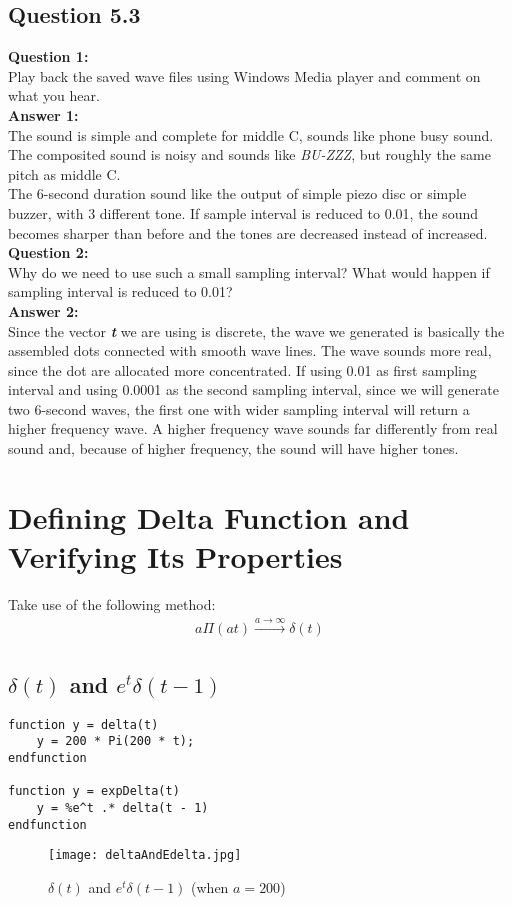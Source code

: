 \documentclass[12pt,fleqn]{article}
\begin{document}
\subsection{Question 5.3}
\textbf{Question 1:}\\
Play back the saved wave files using Windows Media player and comment on what you hear.\\
\textbf{Answer 1:}\\
The sound is simple and complete for middle C, sounds like phone busy sound.\\
The composited sound is noisy and sounds like \emph{BU-ZZZ}, but roughly the same pitch as middle C.\\
The 6-second duration sound like the output of simple piezo disc or simple buzzer, with 3 different tone. If sample interval is reduced to 0.01, the sound becomes sharper than before and the tones are decreased instead of increased.\\
\textbf{Question 2:}\\
Why do we need to use such a small sampling interval? What would happen if sampling interval is reduced to 0.01?\\
\textbf{Answer 2:}\\
Since the vector \emph{\textbf{t}} we are using is discrete, the wave we generated is basically the assembled dots connected with smooth wave lines. The wave sounds more real, since the dot are allocated more concentrated. If using 0.01 as first sampling interval and using 0.0001 as the second sampling interval, since we will generate two 6-second waves, the first one with wider sampling interval will return a higher frequency wave. A higher frequency wave sounds far differently from real sound and, because of higher frequency, the sound will have higher tones.

\section{Defining Delta Function and Verifying Its Properties}
Take use of the following method:\\ 
\begin{gather}
a\Pi{}(at) \xrightarrow{\scriptscriptstyle a\to\infty} \delta{}(t)
\end{gather}
\subsection{$\delta(t)$ and $e^t\delta(t-1)$}
\begin{lstlisting}[frame=single]
function y = delta(t)
    y = 200 * Pi(200 * t);
endfunction

function y = expDelta(t)
    y = %e^t .* delta(t - 1)
endfunction
\end{lstlisting}
\begin{figure}[H]
\centering
\texttt{[image: deltaAndEdelta.jpg]}
\caption{$\delta(t)$ and $e^t\delta(t-1)$ (when $a = 200$)}
\end{figure}
\end{document}
